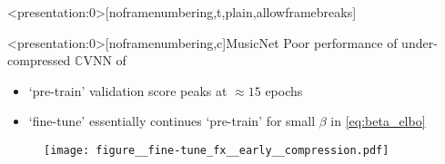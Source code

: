 \documentclass{beamer}
\newcommand{\cplx}{\mathbb{C}}
\begin{document}
\begin{frame}<presentation:0>[noframenumbering,t,plain,allowframebreaks]{\insertsection}
  \tiny
  
  
\end{frame}


\appendix
\begin{frame}<presentation:0>[noframenumbering,c]{MusicNet}{\insertsection}
  Poor performance of under-compressed $\cplx$VNN of \citet{trabelsi_deep_2018}
  \begin{itemize}
    \item `pre-train' validation score peaks at $\approx 15$ epochs
    \item `fine-tune' essentially continues `pre-train' for small $\beta$ in \eqref{eq:beta_elbo}
  \end{itemize}

  \begin{figure}[t]
    \centering
    \texttt{[image: figure\_\_fine-tune\_fx\_\_early\_\_compression.pdf]}
  \end{figure}
\end{frame}
\end{document}
